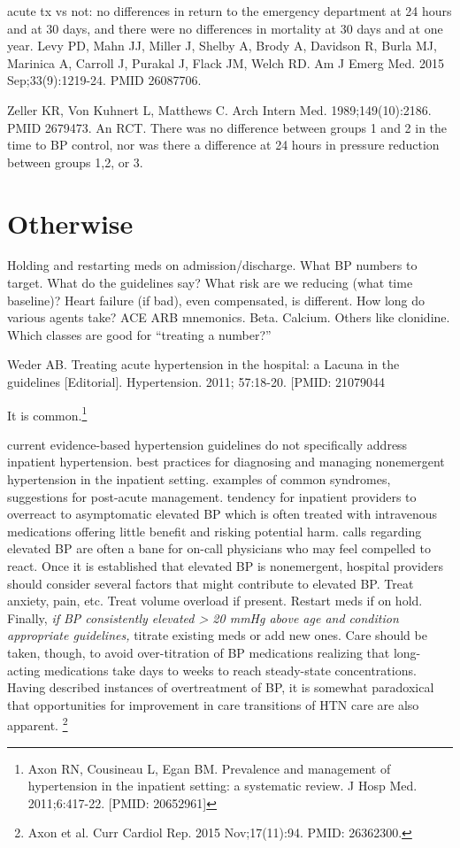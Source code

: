 \documentclass{tufte-handout}
\begin{document}
acute tx vs not: no differences in return to the emergency department at 24 hours and at 30 days, and there were no differences in mortality at 30 days and at one year. Levy PD, Mahn JJ, Miller J, Shelby A, Brody A, Davidson R, Burla MJ, Marinica A, Carroll J, Purakal J, Flack JM, Welch RD. Am J Emerg Med. 2015 Sep;33(9):1219-24.  PMID
26087706.

Zeller KR, Von Kuhnert L, Matthews C. Arch Intern Med. 1989;149(10):2186. PMID 2679473. An RCT.  There was no difference between groups 1 and 2 in the time to BP control, nor was there a difference at 24 hours in pressure reduction between groups 1,2, or 3.






\section{Otherwise}

Holding and restarting meds on admission/discharge.
What BP numbers to target. What do the guidelines
say? What risk are we reducing (what time baseline)?
Heart failure (if bad), even compensated, is different.
How long do various agents take? ACE ARB mnemonics. Beta. Calcium.
Others like clonidine. Which classes are good for ``treating a number?''

Weder AB. Treating acute hypertension in the hospital: a Lacuna in the guidelines [Editorial]. Hypertension. 2011; 57:18-20. [PMID: 21079044

It is common.\footnote{Axon RN, Cousineau L, Egan BM. Prevalence and management of hypertension in the inpatient setting: a systematic review. J Hosp Med. 2011;6:417-22. [PMID: 20652961]}

current evidence-based hypertension guidelines do not specifically address inpatient hypertension. best practices for diagnosing and managing nonemergent hypertension in the inpatient setting. examples of common syndromes, suggestions for post-acute management. tendency for inpatient providers to overreact to asymptomatic elevated BP which is often treated with intravenous medications offering little benefit and risking potential harm.  calls regarding elevated BP are often a bane for on-call physicians who may feel compelled to react. Once it is established that elevated BP is nonemergent, hospital providers should consider several factors that might contribute to elevated BP. Treat anxiety, pain, etc. Treat volume overload if present. Restart meds if on hold. Finally, \emph{if BP consistently elevated > 20 mmHg above age and condition appropriate guidelines,} titrate existing meds or add new ones. Care should be taken, though, to avoid over-titration of BP medications realizing that long-acting medications take days to weeks to reach steady-state concentrations. Having described instances of overtreatment of BP, it is somewhat paradoxical that opportunities for improvement in care transitions of HTN care are also apparent. \footnote{Axon et al. Curr Cardiol Rep. 2015 Nov;17(11):94. PMID: 26362300.}
\end{document}
